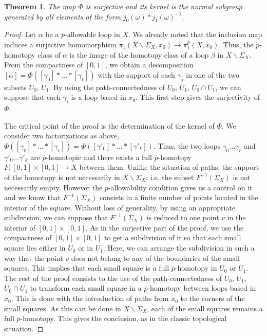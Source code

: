 \documentclass[a4paper,10pt,english,reqno]{amsart}
\theoremstyle{plain}
\newtheorem{theoremb}[proposition]{Theorem}
\theoremstyle{definition}
\theoremstyle{remark}
\numberwithin{equation}{section}
\def\ov{\overline}
\def\menos{\backslash}
\renewcommand\1{\hbox{\ding{192}}}
\renewcommand\2{\hbox{\ding{193}}}
\newcommand\3{\hbox{\ding{194}}}
\newcommand\4{\hbox{\ding{195}}}
\begin{document}
\begin{theoremb}\label{thm:VK}
The map $\Phi$ is surjective and its kernel is the normal subgroup generated by all elements of the form
$j_{0}(\omega)\ast j_{1}(\omega)^{-1}$.
\end{theoremb}

\begin{proof}
%
%
Let $\alpha$ be a $\ov{p}$-allowable loop in $X$. We already noted that the inclusion map induces a
surjective homomorphism
$\pi_{1}(X\menos\Sigma_{X},x_{0})\to \pi_{1}^{\ov{p}}(X,x_{0})$.
Thus, the $\ov{p}$-homotopy class of $\alpha$ is the image of the homotopy class of a loop 
$\beta$ in  $X\menos\Sigma_{X}$.
From the compactness of $[0,1]$, we obtain a decomposition 
$[\alpha]=\Phi([\gamma_{0}]\ast\dots\ast [\gamma_{\ell}])$
with the support of each $\gamma_{j}$ in one of the two subsets $U_{0}$, $U_{1}$. 
By using the path-connectedness of $U_{0}$, $U_{1}$, $U_{0}\cap U_{1}$, we can suppose that
each $\gamma_{i}$ is a loop based in $x_{0}$. This first step gives the surjectivity of $\Phi$.
 
\smallskip
The critical point of the proof is the determination of the kernel of $\Phi$. 
We consider two factorizations as above,
$\Phi([\gamma_{0}]\ast\dots\ast[\gamma_{\ell}])=\Phi([\gamma'_{0}]\ast\dots\ast [\gamma'_{k}])$.
Thus, the two loops $\gamma_{0}\dots\gamma_{\ell}$ and $\gamma'_{0}\dots\gamma'_{k}$ are $\ov{p}$-homotopic
and there exists a full $\ov{p}$-homotopy
$F\colon [0,1]\times [0,1]\to X$
between them.
Unlike the situation of paths, the support of the homotopy is not necessarily in $X\menos \Sigma_{X}$; i.e.
the subset $F^{-1}(\Sigma_{X})$ is not necessarily empty.
However the $\ov{p}$-allowability condition gives us a control on it and we know that 
$F^{-1}(\Sigma_{X})$  consists in a finite number of points located in the interior of the square. 
Without loss of generality, by using an appropriate subdivision,  we can suppose that $F^{-1}(\Sigma_{X})$
is reduced to one point $v$ in the interior of $[0,1]\times [0,1]$.
As in the surjective part of the proof, we use the compactness of $[0,1]\times [0,1]$ to get a subdivision of it
so that each small square  lies either in $U_{0}$ or in $U_{1}$. 
%
Here, we can arrange the subdivision in such a way that the point $v$ does not belong to any of the boundaries
of the small squares. This implies that each small square is  a full $\ov{p}$-homotopy in $U_{0}$ or $U_{1}$.
%
The rest of the proof consists to the use of the path-connectedness of $U_{0}$, $U_{1}$, $U_{0}\cap U_{1}$
to transform each small square in a $\ov{p}$-homotopy between loops based in $x_{0}$.
This is done with the introduction of paths from $x_{0}$ to the corners of the small squares. 
As this can be done in $X\menos \Sigma_{X}$, 
each of the small squares remains a full $\ov{p}$-homotopy.
This gives the conclusion, as in the classic topological situation.
\end{proof}
\end{document}

